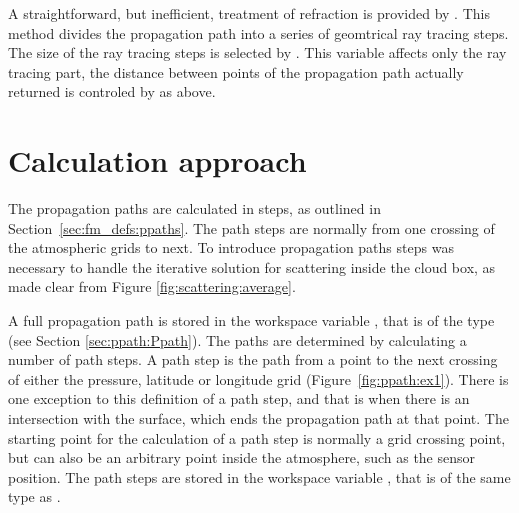 A straightforward, but inefficient, treatment of refraction is provided by
. This method divides the propagation path
into a series of geomtrical ray tracing steps. The size of the ray tracing
steps is selected by . This variable affects only
the ray tracing part, the distance between points of the propagation path
actually returned is controled by  as above.





\section{Calculation approach}
\label{sec:ppath:approach}

The propagation paths are calculated in steps, as outlined in
Section~\ref{sec:fm_defs:ppaths}. The path steps are normally from one crossing
of the atmospheric grids to next. To introduce
propagation paths steps was necessary to handle the iterative solution for
scattering inside the cloud box, as made clear from Figure
\ref{fig:scattering:average}.

A full propagation path is stored in the workspace variable ,
that is of the type  (see Section \ref{sec:ppath:Ppath}). The
paths are determined by calculating a number of path steps. A path step is the
path from a point to the next crossing of either the pressure, latitude or
longitude grid (Figure~\ref{fig:ppath:ex1}). There is one exception to this
definition of a path step, and that is when there is an intersection with the
surface, which ends the propagation path at that point. The starting point for
the calculation of a path step is normally a grid crossing point, but can also
be an arbitrary point inside the atmosphere, such as the sensor position. The
path steps are stored in the workspace variable , that is
of the same type as .

